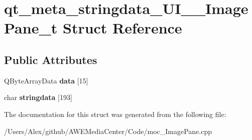 \hypertarget{structqt__meta__stringdata___u_i_____image_pane__t}{\section{qt\-\_\-meta\-\_\-stringdata\-\_\-\-U\-I\-\_\-\-\_\-\-Image\-Pane\-\_\-t Struct Reference}
\label{structqt__meta__stringdata___u_i_____image_pane__t}
}
\subsection*{Public Attributes}
\begin{DoxyCompactItemize}
\item 
\hypertarget{structqt__meta__stringdata___u_i_____image_pane__t_ae7026365a6401d5e1715453bbd4876ed}{Q\-Byte\-Array\-Data {\bfseries data} \mbox{[}15\mbox{]}}\label{structqt__meta__stringdata___u_i_____image_pane__t_ae7026365a6401d5e1715453bbd4876ed}

\item 
\hypertarget{structqt__meta__stringdata___u_i_____image_pane__t_aa3493af29f95c8043b8d3865a191d5fe}{char {\bfseries stringdata} \mbox{[}193\mbox{]}}\label{structqt__meta__stringdata___u_i_____image_pane__t_aa3493af29f95c8043b8d3865a191d5fe}

\end{DoxyCompactItemize}


The documentation for this struct was generated from the following file\-:\begin{DoxyCompactItemize}
\item 
/\-Users/\-Alex/github/\-A\-W\-E\-Media\-Center/\-Code/moc\-\_\-\-Image\-Pane.\-cpp\end{DoxyCompactItemize}
